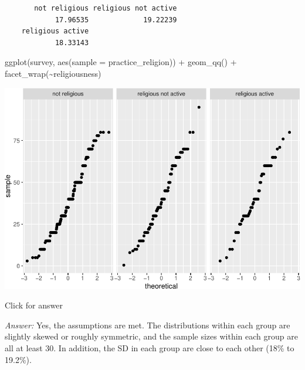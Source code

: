 \documentclass[
]{book}
\newenvironment{Shaded}{\begin{snugshade}}{\end{snugshade}}
\newcommand{\AttributeTok}[1]{\textcolor[rgb]{0.77,0.63,0.00}{#1}}
\newcommand{\CommentTok}[1]{\textcolor[rgb]{0.56,0.35,0.01}{\textit{#1}}}
\newcommand{\ConstantTok}[1]{\textcolor[rgb]{0.00,0.00,0.00}{#1}}
\newcommand{\FunctionTok}[1]{\textcolor[rgb]{0.00,0.00,0.00}{#1}}
\newcommand{\NormalTok}[1]{#1}
\newcommand{\SpecialCharTok}[1]{\textcolor[rgb]{0.00,0.00,0.00}{#1}}
\begin{document}
\begin{Shaded}
\end{Shaded}

\begin{verbatim}
       not religious religious not active 
            17.96535             19.22239 
    religious active 
            18.33143 
\end{verbatim}

\begin{Shaded}
\begin{Highlighting}[]
\FunctionTok{ggplot}\NormalTok{(survey, }\FunctionTok{aes}\NormalTok{(}\AttributeTok{sample =}\NormalTok{ practice\_religion)) }\SpecialCharTok{+} \FunctionTok{geom\_qq}\NormalTok{() }\SpecialCharTok{+} \FunctionTok{facet\_wrap}\NormalTok{(}\SpecialCharTok{\textasciitilde{}}\NormalTok{religiousness)}
\end{Highlighting}
\end{Shaded}

\includegraphics[width=1\linewidth]{Class_Activity_22_files/figure-latex/unnamed-chunk-5-1}

Click for answer

\emph{Answer:} Yes, the assumptions are met. The distributions within each group are slightly skewed or roughly symmetric, and the sample sizes within each group are all at least 30. In addition, the SD in each group are close to each other (18\% to 19.2\%).
\end{document}
